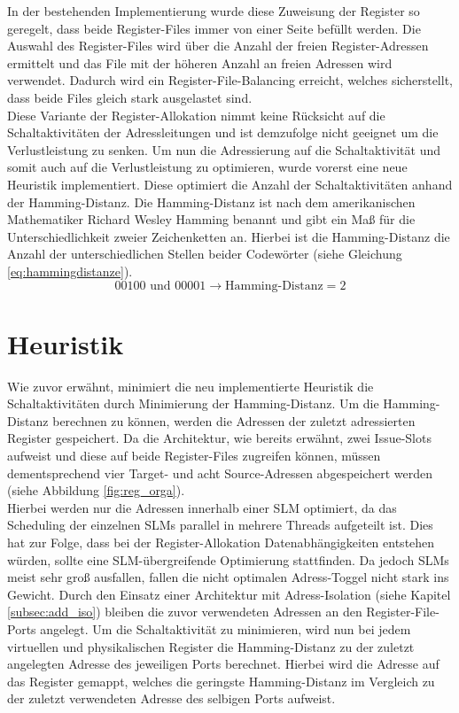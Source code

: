 In der bestehenden Implementierung wurde diese Zuweisung der Register so geregelt, dass beide Register-Files immer von einer Seite befüllt werden. Die Auswahl des Register-Files wird über die Anzahl der freien Register-Adressen ermittelt und das File mit der höheren Anzahl an freien Adressen wird verwendet. Dadurch wird ein Register-File-Balancing erreicht, welches sicherstellt, dass beide Files gleich stark ausgelastet sind.\\
Diese Variante der Register-Allokation nimmt keine Rücksicht auf die Schaltaktivitäten der Adressleitungen und ist demzufolge nicht geeignet um die Verlustleistung zu senken.
Um nun die Adressierung auf die Schaltaktivität und somit auch auf die Verlustleistung zu optimieren, wurde vorerst eine neue Heuristik implementiert.
Diese optimiert die Anzahl der Schaltaktivitäten anhand der Hamming-Distanz.
Die Hamming-Distanz ist nach dem amerikanischen Mathematiker Richard Wesley Hamming benannt und gibt ein Maß für die Unterschiedlichkeit zweier Zeichenketten an. Hierbei ist die Hamming-Distanz die Anzahl der unterschiedlichen Stellen beider Codewörter (siehe Gleichung \ref{eq:hammingdistanze}). \cite{hamming1950error}
\begin{equation}
00100 \text{ und } 00001 \rightarrow \text{Hamming-Distanz}= 2
\label{eq:hammingdistanze}
\end{equation}
 
\section{Heuristik}
\label{sec:Heuristik}
Wie zuvor erwähnt, minimiert die neu implementierte Heuristik die Schaltaktivitäten durch Minimierung der Hamming-Distanz. Um die Hamming-Distanz berechnen zu können, werden die Adressen der zuletzt adressierten Register gespeichert. Da die Architektur, wie bereits erwähnt, zwei Issue-Slots aufweist und diese auf beide Register-Files zugreifen können, müssen dementsprechend vier Target- und acht Source-Adressen abgespeichert werden (siehe Abbildung \ref{fig:reg_orga}).\\
Hierbei werden nur die Adressen innerhalb einer SLM optimiert, da das Scheduling der einzelnen SLMs parallel in mehrere Threads aufgeteilt ist. Dies hat zur Folge, dass bei der Register-Allokation Datenabhängigkeiten entstehen würden, sollte eine SLM-übergreifende Optimierung stattfinden. Da jedoch SLMs meist sehr groß ausfallen, fallen die nicht optimalen Adress-Toggel nicht stark ins Gewicht. 
Durch den Einsatz einer Architektur mit Adress-Isolation (siehe Kapitel \ref{subsec:add_iso}) bleiben die zuvor verwendeten Adressen an den Register-File-Ports angelegt. Um die Schaltaktivität zu minimieren, wird nun bei jedem virtuellen und physikalischen Register die Hamming-Distanz zu der zuletzt angelegten Adresse des jeweiligen Ports berechnet. Hierbei wird die Adresse auf das Register gemappt, welches die geringste Hamming-Distanz im Vergleich zu der zuletzt verwendeten Adresse des selbigen Ports aufweist.\\


